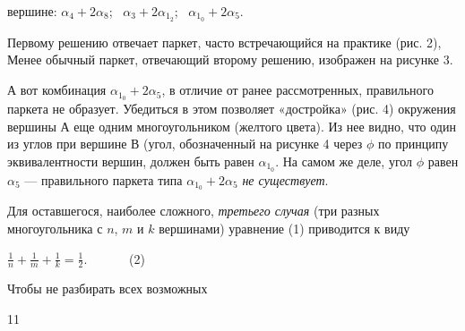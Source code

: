 \begin{multicols}{2}
\noindent
вершине:
$\alpha_4 + 2\alpha_8$; \ $\alpha_3+2\alpha_1_2$; \ $\alpha_1_0+2\alpha_5$.

Первому решению отвечает паркет, часто встречающийся на практике (рис. 2), Менее обычный паркет, отвечающий второму решению, изображен на рисунке 3.

А вот комбинация $\alpha_1_0 + 2\alpha_5$, в
отличие от ранее рассмотренных, правильного паркета не образует. Убедиться в этом позволяет «достройка» (рис. 4) окружения вершины $А$ еще одним многоугольником (желтого цвета). Из нее видно, что один из углов при вершине $В$ (угол, обозначенный на рисунке 4 через $\phi$ по принципу эквивалентности вершин, должен быть равен $\alpha_1_0$. На самом же деле, угол $\phi$ равен $\alpha_5$ — правильного паркета типа $\alpha_1_0 + 2\alpha_5$ \textit{не существует}.

Для оставшегося, наиболее сложного, \textit{третьего случая} (три разных многоугольника с $n$, $m$ и $k$ вершинами) уравнение (1) приводится к виду
\begin{center}
    $\frac{1}{n} + \frac{1}{m} + \frac{1}{k} = \frac{1}{2}$. \ \ \ \ \ \ (2)
    
\end{center}
Чтобы не разбирать всех возможных
\vspace{\fill}
\begin{flushright}
    11
\end{flushright}
\end{multicols}


